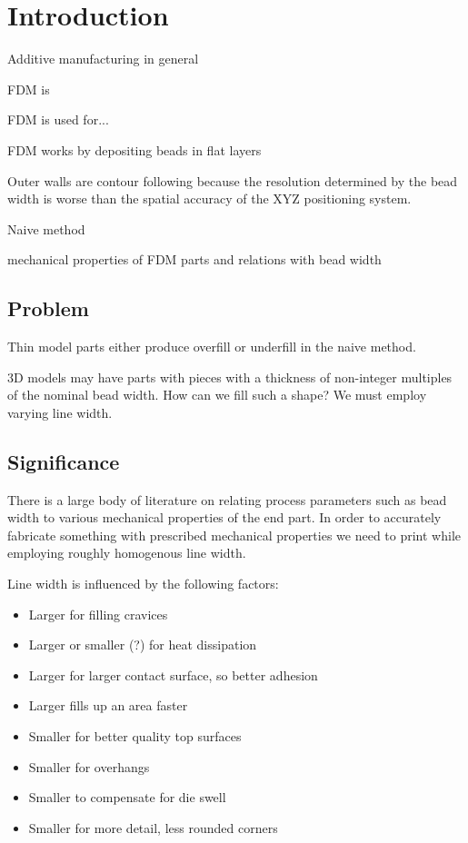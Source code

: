 \section{Introduction}
Additive manufacturing in general

FDM is

FDM is used for...

FDM works by depositing beads in flat layers

Outer walls are contour following because the resolution determined by the bead width is worse than the spatial accuracy of the XYZ positioning system.

Naive method

mechanical properties of FDM parts and relations with bead width




\subsection{Problem}
Thin model parts either produce overfill or underfill in the naive method.

3D models may have parts with pieces with a thickness of non-integer multiples of the nominal bead width.
How can we fill such a shape?
We must employ varying line width.



\subsection{Significance}

There is a large body of literature on relating process parameters such as bead width to various mechanical properties of the end part.
In order to accurately fabricate something with prescribed mechanical properties we need to print while employing roughly homogenous line width.

Line width is influenced by the following factors:
\begin{itemize}
\item Larger for filling cravices
\item Larger or smaller (?) for heat dissipation
\item Larger for larger contact surface, so better adhesion \cite{N.Turner2014}
\item Larger fills up an area faster \cite{ahn2002anisotropic}
\item Smaller for better quality top surfaces \cite{ahn2002anisotropic}
\item Smaller for overhangs
\item Smaller to compensate for die swell
\item Smaller for more detail, less rounded corners \cite{N.Turner2014}
\end{itemize}



